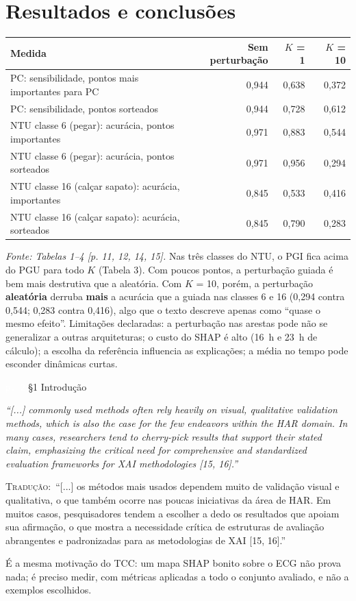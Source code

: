 \documentclass[11pt,a4paper]{article}
\newcommand{\pagechip}[1]{{\setlength{\fboxsep}{1.5pt}\colorbox{cAcc}{\textcolor{white}{\scriptsize\texttt{#1}}}}}
\newenvironment{origquote}{\par\itshape\small}{\par}
\newenvironment{tradquote}{\par\small\textsc{Tradução:}\ }{\par}
\newcommand{\explab}[1]{\par\smallskip{\small\color{cAcc}\textbf{\MakeUppercase{#1}}}\par}
\begin{document}
\section{Resultados e conclusões}
\begin{center}\small
\begin{tabularx}{\linewidth}{Xrrr}
\toprule
\textbf{Medida} & \textbf{Sem perturbação} & \textbf{$K$ = 1} & \textbf{$K$ = 10} \\
\midrule
PC: sensibilidade, pontos mais importantes para PC & 0,944 & 0,638 & 0,372 \\
PC: sensibilidade, pontos sorteados & 0,944 & 0,728 & 0,612 \\
NTU classe 6 (pegar): acurácia, pontos importantes & 0,971 & 0,883 & 0,544 \\
NTU classe 6 (pegar): acurácia, pontos sorteados & 0,971 & 0,956 & 0,294 \\
NTU classe 16 (calçar sapato): acurácia, importantes & 0,845 & 0,533 & 0,416 \\
NTU classe 16 (calçar sapato): acurácia, sorteados & 0,845 & 0,790 & 0,283 \\
\bottomrule
\end{tabularx}
\end{center}
\textit{Fonte: Tabelas 1--4 [p. 11, 12, 14, 15].} Nas três classes do NTU, o PGI fica acima do PGU para todo $K$ (Tabela 3). Com poucos pontos, a perturbação guiada é bem mais destrutiva que a aleatória. Com $K$ = 10, porém, a perturbação \textbf{aleatória} derruba \textbf{mais} a acurácia que a guiada nas classes 6 e 16 (0,294 contra 0,544; 0,283 contra 0,416), algo que o texto descreve apenas como “quase o mesmo efeito”. Limitações declaradas: a perturbação nas arestas pode não se generalizar a outras arquiteturas; o custo do SHAP é alto (16~h e 23~h de cálculo); a escolha da referência influencia as explicações; a média no tempo pode esconder dinâmicas curtas.

\begin{citacard}{\pagechip{p. 2} §1 Introdução}
\begin{origquote}“[...] commonly used methods often rely heavily on visual, qualitative validation methods, which is also the case for the few endeavors within the HAR domain. In many cases, researchers tend to cherry-pick results that support their stated claim, emphasizing the critical need for comprehensive and standardized evaluation frameworks for XAI methodologies [15, 16].”\end{origquote}
\begin{tradquote}“[...] os métodos mais usados dependem muito de validação visual e qualitativa, o que também ocorre nas poucas iniciativas da área de HAR. Em muitos casos, pesquisadores tendem a escolher a dedo os resultados que apoiam sua afirmação, o que mostra a necessidade crítica de estruturas de avaliação abrangentes e padronizadas para as metodologias de XAI [15, 16].”\end{tradquote}
\explab{Explicação}
É a mesma motivação do TCC: um mapa SHAP bonito sobre o ECG não prova nada; é preciso medir, com métricas aplicadas a todo o conjunto avaliado, e não a exemplos escolhidos.
\end{citacard}
\end{document}

